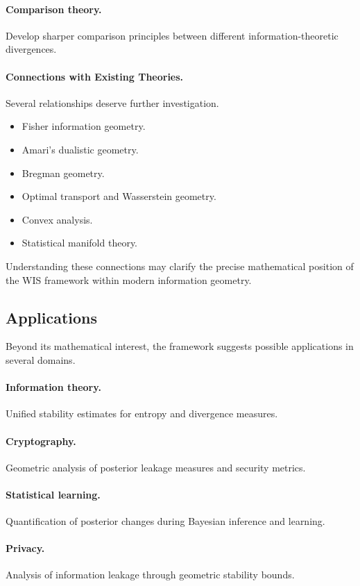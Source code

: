 \paragraph{Comparison theory.}
Develop sharper comparison principles between different
information-theoretic divergences.

\paragraph{Connections with Existing Theories.}
Several relationships deserve further investigation.
\begin{itemize}
\item Fisher information geometry.
\item Amari's dualistic geometry.
\item Bregman geometry.
\item Optimal transport and Wasserstein geometry.
\item Convex analysis.
\item Statistical manifold theory.
\end{itemize}
Understanding these connections may clarify the precise mathematical
position of the WIS framework within modern information geometry.

\subsection{Applications}
Beyond its mathematical interest, the framework suggests possible
applications in several domains.

\paragraph{Information theory.}
Unified stability estimates for entropy and divergence measures.

\paragraph{Cryptography.}
Geometric analysis of posterior leakage measures and security metrics.

\paragraph{Statistical learning.}
Quantification of posterior changes during Bayesian inference and
learning.

\paragraph{Privacy.}
Analysis of information leakage through geometric stability bounds.

